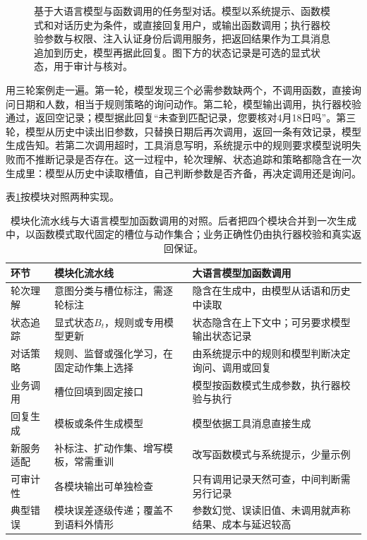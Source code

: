 \begin{figure}[htbp]
  \centering
  
  \caption{基于大语言模型与函数调用的任务型对话。模型以系统提示、函数模式和对话历史为条件，或直接回复用户，或输出函数调用；执行器校验参数与权限、注入认证身份后调用服务，把返回结果作为工具消息追加到历史，模型再据此回复。图下方的状态记录是可选的显式状态，用于审计与核对。}
  \label{fig:nlp-dialogue-function-loop}
\end{figure}

用三轮案例走一遍。第一轮，模型发现三个必需参数缺两个，不调用函数，直接询问日期和人数，相当于规则策略的询问动作。第二轮，模型输出调用，执行器校验通过，返回空记录；模型据此回复“未查到匹配记录，您要核对4月18日吗”。第三轮，模型从历史中读出旧参数，只替换日期后再次调用，返回一条有效记录，模型生成告知。若第二次调用超时，工具消息写明，系统提示中的规则要求模型说明失败而不推断记录是否存在。这一过程中，轮次理解、状态追踪和策略都隐含在一次生成里：模型从历史中读取槽值，自己判断参数是否齐备，再决定调用还是询问。

表\ref{tab:nlp-dialogue-pipeline-vs-llm}按模块对照两种实现。

\begin{table}[htbp]
\centering
\small
\begin{tabular}{p{20mm}p{58mm}p{70mm}}
\toprule
环节 & 模块化流水线 & 大语言模型加函数调用 \\
\midrule
轮次理解 & 意图分类与槽位标注，需逐轮标注 & 隐含在生成中，由模型从话语和历史中读取 \\
状态追踪 & 显式状态$B_t$，规则或专用模型更新 & 状态隐含在上下文中；可另要求模型输出状态记录 \\
对话策略 & 规则、监督或强化学习，在固定动作集上选择 & 由系统提示中的规则和模型判断决定询问、调用或回复 \\
业务调用 & 槽位回填到固定接口 & 模型按函数模式生成参数，执行器校验与执行 \\
回复生成 & 模板或条件生成模型 & 模型依据工具消息直接生成 \\
新服务适配 & 补标注、扩动作集、增写模板，常需重训 & 改写函数模式与系统提示，少量示例 \\
可审计性 & 各模块输出可单独检查 & 只有调用记录天然可查，中间判断需另行记录 \\
典型错误 & 模块误差逐级传递；覆盖不到语料外情形 & 参数幻觉、误读旧值、未调用就声称结果、成本与延迟较高 \\
\bottomrule
\end{tabular}
\caption{模块化流水线与大语言模型加函数调用的对照。后者把四个模块合并到一次生成中，以函数模式取代固定的槽位与动作集合；业务正确性仍由执行器校验和真实返回保证。}
\label{tab:nlp-dialogue-pipeline-vs-llm}
\end{table}

